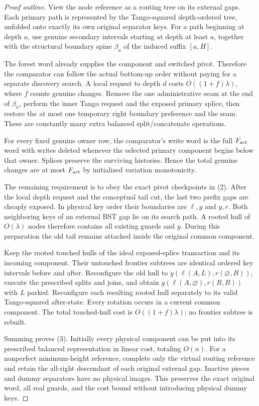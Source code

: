 \documentclass[11pt]{article}
\begin{document}
\begin{proof}[Proof outline]
View the node reference as a routing tree on its external gaps. Each
primary path is represented by the Tango-squared depth-ordered tree,
unfolded onto exactly its own original separator keys. For a path
beginning at depth $a$, use genuine secondary intervals starting at
depth at least $a$, together with the structural boundary spine
$\beta_a$ of the induced suffix $[a,H]$.

The forest word already supplies the component and switched pivot.
Therefore the comparator can follow the actual bottom-up order without
paying for a separate discovery search. A local request to depth $d$
costs $O((1+f)\lambda)$, where $f$ counts genuine changes. Remove
the one administrative seam at the end of $\beta_a$, perform the inner
Tango request and the exposed primary splice, then restore the at most
one temporary right boundary preference and the seam. These are
constantly many extra balanced split/concatenate operations.

For every fixed genuine owner row, the comparator's write word is the
full $F_{\rm act}$ word with writes deleted whenever the selected
primary component begins below that owner. Splices preserve the
surviving histories. Hence the total genuine changes are at most
$F_{\rm act}$ by initialized variation monotonicity.

The remaining requirement is to obey the exact pivot checkpoints in
(2). After the local depth request and the conceptual tail cut, the
last two prefix gaps are cheaply exposed. In physical key order their
boundaries are $\ell,y$ and $y,r$. Both neighboring keys of an external
BST gap lie on its search path. A rooted hull of $O(\lambda)$ nodes
therefore contains all existing guards and $y$. During this preparation
the old tail remains attached inside the original common component.

Keep the rooted touched hulls of the ideal exposed-splice transaction
and its incoming component. Their untouched frontier subtrees are
identical ordered key intervals before and after. Reconfigure the
old hull to $y(\ell(A,L),r(\varnothing,B))$, execute the prescribed
splits and joins, and obtain $y(\ell(A,\varnothing),r(R,B))$ with
$L$ parked. Reconfigure each resulting rooted hull separately to its
valid Tango-squared after-state. Every rotation occurs in a current
common component. The total touched-hull cost is
$O((1+f)\lambda)$; no frontier subtree is rebuilt.

Summing proves (3). Initially every physical component can be put
into its prescribed balanced representation in linear cost, totaling
$O(n)$. For a nonperfect minimum-height reference, complete only the
virtual routing reference and retain the all-right descendant of
each original external gap. Inactive pieces and dummy separators have
no physical images. This preserves the exact original word, all real
guards, and the cost bound without introducing physical dummy keys.
\end{proof}
\end{document}
